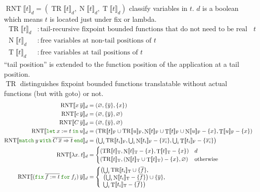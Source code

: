 \documentclass[a4paper,fleqn]{article}
\newcommand{\kwlet}{\mbox{\color{mygreen}\ttfamily let}}
\newcommand{\kwin}{\mbox{\color{mygreen}\ttfamily in}}
\newcommand{\kwmatch}{\mbox{\color{mygreen}\ttfamily match}}
\newcommand{\kwwith}{\mbox{\color{mygreen}\ttfamily with}}
\newcommand{\kwend}{\mbox{\color{mygreen}\ttfamily end}}
\newcommand{\kwfix}{\mbox{\color{mygreen}\ttfamily fix}}
\newcommand{\kwfor}{\mbox{\color{mygreen}\ttfamily for}}
\newcommand{\lam}[2]{\lambda #1.\:#2}
\newcommand{\letin}[3]{\kwlet\:#1:=#2\:\kwin\:#3}
\newcommand{\omatch}[2]{\kwmatch\:#1\:\kwwith\:{#2}\:\kwend}
\newcommand{\ofix}[2]{\kwfix\:{#1}\:\kwfor\:{#2}}
\newcommand{\tbigcup}{{\textstyle\bigcup}}
\newcommand{\BRA}[1]{\llbracket #1 \rrbracket}
\DeclareMathOperator{\TRop}{TR}
\newcommand{\TR}[2]{\TRop\BRA{#1}_{#2}}
\DeclareMathOperator{\RNTop}{RNT}
\newcommand{\RNT}[2]{\RNTop\BRA{#1}_{#2}}
\DeclareMathOperator{\Nop}{N}
\DeclareMathOperator{\Top}{T}
\newcommand{\N}[2]{\Nop\BRA{#1}_{#2}}
\newcommand{\T}[2]{\Top\BRA{#1}_{#2}}
\newcommand{\true}{\mathrm{T}}
\newcommand{\false}{\mathrm{F}}
\newcommand{\kwgoto}{\mbox{\color{myviolet}\ttfamily goto}}
\newcommand{\rep}[1]{\overline{#1}}
\begin{document}
$\RNT{t}{d} = (\TR{t}{d}, \N{t}{d}, \T{t}{d})$ classify variables in $t$.
$d$ is a boolean which means $t$ is located just under \kwfix{} or lambda.
\begin{align*}
  \TR{t}{d} &: \text{tail-recursive fixpoint bounded functions that do not need to be real functions in $t$} \\
  \N{t}{d} &: \text{free variables at non-tail positions of $t$} \\
  \T{t}{d} &: \text{free variables at tail positions of $t$}
\end{align*}
``tail position'' is extended to the function position of the application at a tail position. \\
$\TRop$ distinguishes fixpoint bounded functions translatable without actual functions (but with \kwgoto{}) or not.
\begin{align*}
  \RNT{x\:\rep{y}}{d} &= (\varnothing, \{\rep{y}\}, \{x\}) \\
  \RNT{c\:\rep{y}}{d} &= (\varnothing, \{\rep{y}\}, \varnothing) \\
  \RNT{C\:\rep{y}}{d} &= (\varnothing, \{\rep{y}\}, \varnothing) \\
  \RNT{\letin{x}{t}{u}}{d} &= (\TR{t}{\false} \cup \TR{u}{\false}, \N{t}{\false} \cup \T{t}{\false} \cup \N{u}{\false} - \{x\}, \T{u}{\false} - \{x\}) \\
  \RNT{\omatch{y}{\rep{C\:\rep{x}\Rightarrow t}}}{d} &= \bigl(\tbigcup_i \TR{t_i}{\false}, \tbigcup_i \N{t_i}{\false} - \{\rep{x_i}\}, \tbigcup_i \T{t_i}{\false} - \{\rep{x_i}\} \bigr) \\
  \RNT{\lam{x}{t}}{d} &=
    \begin{cases}
      (\TR{t}{\true}, \N{t}{\true}-\{x\}, \T{t}{\true} - \{x\}) & d \\
      (\TR{t}{\true}, (\N{t}{\true} \cup \T{t}{\true}) - \{x\}, \varnothing) & \text{otherwise}
    \end{cases} \\
  \RNT{(\ofix{\rep{f:=t}}{f_j})\:\rep{y}}{d} &=
    \begin{cases}
      \begin{aligned}[t]
        \bigl(& \tbigcup_i \TR{t_i}{\true} \cup \{\rep{f}\}, \\
              & \bigl(\tbigcup_i \N{t_i}{\true} - \{\rep{f}\}\bigr) \cup \{\rep{y}\}, \\
              & \tbigcup_i \T{t_i}{\true} - \{\rep{f}\} \bigr)
      \end{aligned}
        & \begin{aligned}[t]

\end{aligned}
\end{cases}
\end{align*}
\end{document}
